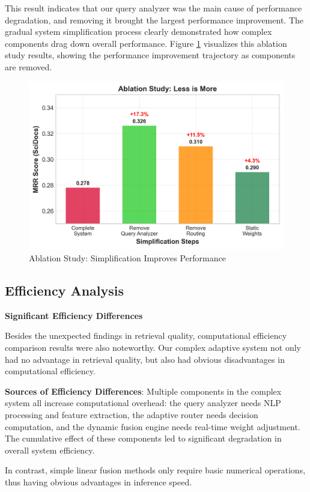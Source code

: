 \documentclass[letterpaper]{article} %
\begin{document}
This result indicates that our query analyzer was the main cause of performance degradation, and removing it brought the largest performance improvement. The gradual system simplification process clearly demonstrated how complex components drag down overall performance. Figure \ref{fig:ablation} visualizes this ablation study results, showing the performance improvement trajectory as components are removed.

\begin{figure}[t]
\centering
\includegraphics[width=0.8\columnwidth]{charts/ablation_study.png}
\caption{Ablation Study: Simplification Improves Performance}
\label{fig:ablation}
\end{figure}

\subsection{Efficiency Analysis}

\textbf{Significant Efficiency Differences}

Besides the unexpected findings in retrieval quality, computational efficiency comparison results were also noteworthy. Our complex adaptive system not only had no advantage in retrieval quality, but also had obvious disadvantages in computational efficiency.

\textbf{Sources of Efficiency Differences}:
Multiple components in the complex system all increase computational overhead: the query analyzer needs NLP processing and feature extraction, the adaptive router needs decision computation, and the dynamic fusion engine needs real-time weight adjustment. The cumulative effect of these components led to significant degradation in overall system efficiency.

In contrast, simple linear fusion methods only require basic numerical operations, thus having obvious advantages in inference speed.
\end{document}
